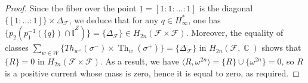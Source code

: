 \documentclass[12pt]{amsbook}%
\newtheorem{prop}[thm]{Proposition}
\theoremstyle{definition}
\theoremstyle{remark}
\numberwithin{section}{chapter}
\numberwithin{subsection}{section}
\numberwithin{figure}{chapter}
\DeclareMathOperator{\C}{\mathbb{C}}
\DeclareMathOperator{\Th}{Th}
\newcommand\bac[1]{{\color{blue} #1} }
\newcommand\intcur[1]{\llbracket #1 \rrbracket}
\def\bP{{\mathbb{P}}}
\def\cF{{\mathscr{F}}}
\begin{document}
{{\begin{proof}
Since the fiber over the point $\underline{1}= [1: 1 : \ldots :1]$ is the diagonal $\{ [1: \ldots : 1] \} \times \Delta_{\cF}$, we deduce that for any $q\in H_\infty^*$, one has 
$	\{ p_2 (p_1^{-1}(\{q\}) \cap \bar{\mathbb{I}}^Z) \} = \{\Delta_{\cF} \} \in H_{2n}(\cF\times \cF). 
$%
Moreover, the equality of classes
$
	\sum_{w\in W} \{  Th_{w^\vee} (\sigma^-) \times \Th_w(\sigma^+)\} = \{ \Delta_{\cF} \} 
$
in $H_{2n}(\cF, \C)$ shows that $\{ R\} = 0$ in $H_{2n}(\cF\times \cF)$. As a result, 
we have $\langle R, \omega^{2n} \rangle = \{ R\} \cup \{ \omega^{2n}\} =0 $, so $R$ is a positive current whose mass is zero, hence it is equal to zero, as required.  
\end{proof}


}}
\end{document}
